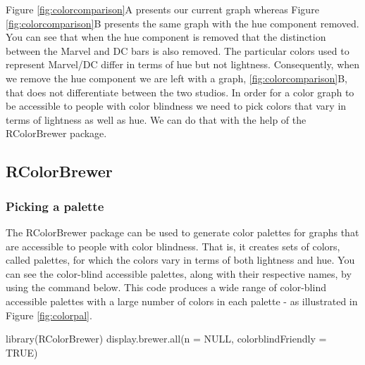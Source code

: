 \documentclass[
]{krantz}
\makeatletter
\newenvironment{Shaded}{\begin{snugshade}}{\end{snugshade}}
\newcommand{\AttributeTok}[1]{\textcolor[rgb]{0.61,0.61,0.61}{#1}}
\newcommand{\ConstantTok}[1]{\textcolor[rgb]{0,0,0}{#1}}
\newcommand{\FunctionTok}[1]{\textcolor[rgb]{0,0,0}{#1}}
\newcommand{\NormalTok}[1]{#1}
\newenvironment{kframe}{%
\medskip{}
\setlength{\fboxsep}{.8em}
 \def\at@end@of@kframe{}%
 \ifinner\ifhmode%
  \def\at@end@of@kframe{\end{minipage}}%
  \begin{minipage}{\columnwidth}%
 \fi\fi%
 \def\FrameCommand##1{\hskip\@totalleftmargin \hskip-\fboxsep
 \colorbox{shadecolor}{##1}\hskip-\fboxsep
     \hskip-\linewidth \hskip-\@totalleftmargin \hskip\columnwidth}%
 \MakeFramed {\advance\hsize-\width
   \@totalleftmargin\z@ \linewidth\hsize
   \@setminipage}}%
 {\par\unskip\endMakeFramed%
 \at@end@of@kframe}
\renewenvironment{Shaded}{\begin{kframe}}{\end{kframe}}
\makeatother
\begin{document}
Figure \ref{fig:colorcomparison}A presents our current graph whereas Figure \ref{fig:colorcomparison}B presents the same graph with the hue component removed. You can see that when the hue component is removed that the distinction between the Marvel and DC bars is also removed. The particular colors used to represent Marvel/DC differ in terms of hue but not lightness. Consequently, when we remove the hue component we are left with a graph, \ref{fig:colorcomparison}B, that does not differentiate between the two studios. In order for a color graph to be accessible to people with color blindness we need to pick colors that vary in terms of lightness as well as hue. We can do that with the help of the RColorBrewer package.

\hypertarget{rcolorbrewer}{%
\subsection{RColorBrewer}\label{rcolorbrewer}}

\hypertarget{picking-a-palette}{%
\subsubsection{Picking a palette}\label{picking-a-palette}}

The RColorBrewer package can be used to generate color palettes for graphs that are accessible to people with color blindness. That is, it creates sets of colors, called palettes, for which the colors vary in terms of both lightness and hue. You can see the color-blind accessible palettes, along with their respective names, by using the command below. This code produces a wide range of color-blind accessible palettes with a large number of colors in each palette - as illustrated in Figure \ref{fig:colorpal}.

\begin{Shaded}
\begin{Highlighting}[]
\FunctionTok{library}\NormalTok{(RColorBrewer)}
\FunctionTok{display.brewer.all}\NormalTok{(}\AttributeTok{n =} \ConstantTok{NULL}\NormalTok{, }\AttributeTok{colorblindFriendly =} \ConstantTok{TRUE}\NormalTok{)}
\end{Highlighting}
\end{Shaded}
\end{document}
